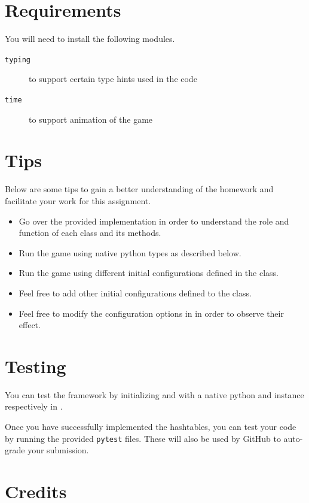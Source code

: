 \documentclass[addpoints]{exam}
\begin{document}
\section*{Requirements}

You will need to install the following modules.
\begin{description}
  \item [\texttt{typing}] to support certain type hints used in the code
  \item [\texttt{time}] to support animation of the game
\end{description}

\section*{Tips}

Below are some tips to gain a better understanding of the homework and facilitate your work for this assignment.
\begin{itemize}
  \item Go over the provided implementation in order to understand the role and function of each class and its methods.
  \item Run the game using native python types as described below.
  \item Run the game using different initial configurations defined in the  class.
  \item Feel free to add other initial configurations defined to the  class.
  \item Feel free to modify the configuration options in  in order to observe their effect.
\end{itemize}

\section*{Testing}

You can test the framework by initializing  and  with a native python  and  instance respectively in .

Once you have successfully implemented the hashtables, you can test your code by running the provided \texttt{pytest} files. These will also be used by GitHub to auto-grade your submission.

\section*{Credits}
\end{document}
